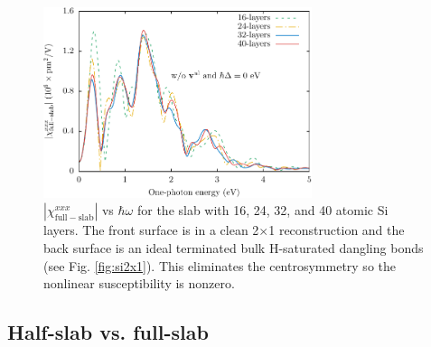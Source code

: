 {\begin{figure}
\centering 
\includegraphics[width=0.7\textwidth]{content/figures/fig-4_1_02}
\caption{$|\chi_{\mathrm{full-slab}}^{xxx}|$ vs $\hbar\omega$
for the slab with 16, 24, 32, and 40 atomic Si layers. The front surface is in a
clean 2$\times$1 reconstruction and the back surface is an ideal terminated bulk
H-saturated dangling bonds (see Fig. \ref{fig:si2x1}). This eliminates the
centrosymmetry so the nonlinear susceptibility is nonzero.
\label{fig:layersconv}}
\end{figure}



\subsection{Half-slab vs. full-slab}

}
